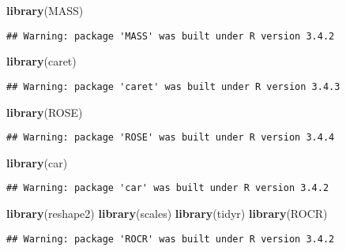 \documentclass[]{article}
\newenvironment{Shaded}{\begin{snugshade}}{\end{snugshade}}
\newcommand{\KeywordTok}[1]{\textcolor[rgb]{0.13,0.29,0.53}{\textbf{{#1}}}}
\newcommand{\NormalTok}[1]{{#1}}
\begin{document}
\begin{Shaded}
\begin{Highlighting}[]
\KeywordTok{library}\NormalTok{(MASS)}
\end{Highlighting}
\end{Shaded}

\begin{verbatim}
## Warning: package 'MASS' was built under R version 3.4.2
\end{verbatim}

\begin{Shaded}
\begin{Highlighting}[]
\KeywordTok{library}\NormalTok{(caret)}
\end{Highlighting}
\end{Shaded}

\begin{verbatim}
## Warning: package 'caret' was built under R version 3.4.3
\end{verbatim}

\begin{Shaded}
\begin{Highlighting}[]
\KeywordTok{library}\NormalTok{(ROSE)}
\end{Highlighting}
\end{Shaded}

\begin{verbatim}
## Warning: package 'ROSE' was built under R version 3.4.4
\end{verbatim}

\begin{Shaded}
\begin{Highlighting}[]
\KeywordTok{library}\NormalTok{(car)}
\end{Highlighting}
\end{Shaded}

\begin{verbatim}
## Warning: package 'car' was built under R version 3.4.2
\end{verbatim}

\begin{Shaded}
\begin{Highlighting}[]
\KeywordTok{library}\NormalTok{(reshape2)}
\KeywordTok{library}\NormalTok{(scales)}
\KeywordTok{library}\NormalTok{(tidyr)}
\KeywordTok{library}\NormalTok{(ROCR)}
\end{Highlighting}
\end{Shaded}

\begin{verbatim}
## Warning: package 'ROCR' was built under R version 3.4.2
\end{verbatim}
\end{document}
